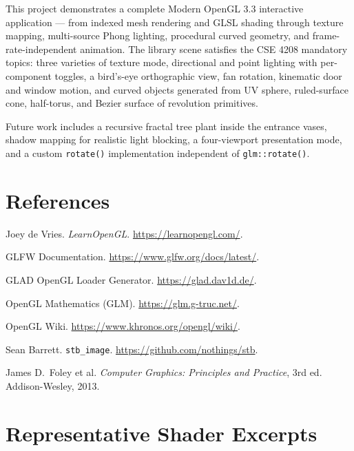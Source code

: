 \documentclass[12pt, a4paper]{article}
\begin{document}
This project demonstrates a complete Modern OpenGL 3.3 interactive application — from indexed mesh rendering and GLSL shading through texture mapping, multi-source Phong lighting, procedural curved geometry, and frame-rate-independent animation. The library scene satisfies the CSE 4208 mandatory topics: three varieties of texture mode, directional and point lighting with per-component toggles, a bird's-eye orthographic view, fan rotation, kinematic door and window motion, and curved objects generated from UV sphere, ruled-surface cone, half-torus, and Bezier surface of revolution primitives.

Future work includes a recursive fractal tree plant inside the entrance vases, shadow mapping for realistic light blocking, a four-viewport presentation mode, and a custom \texttt{rotate()} implementation independent of \texttt{glm::rotate()}.

\section*{References}

\begin{enumerate}[label={[\arabic*]}, leftmargin=2em]
    \item Joey de Vries. \textit{LearnOpenGL}. \url{https://learnopengl.com/}.
    \item GLFW Documentation. \url{https://www.glfw.org/docs/latest/}.
    \item GLAD OpenGL Loader Generator. \url{https://glad.dav1d.de/}.
    \item OpenGL Mathematics (GLM). \url{https://glm.g-truc.net/}.
    \item OpenGL Wiki. \url{https://www.khronos.org/opengl/wiki/}.
    \item Sean Barrett. \texttt{stb\_image}. \url{https://github.com/nothings/stb}.
    \item James D.\ Foley et al. \textit{Computer Graphics: Principles and Practice}, 3rd ed. Addison-Wesley, 2013.
\end{enumerate}

\appendix
\section{Representative Shader Excerpts}
\end{document}
